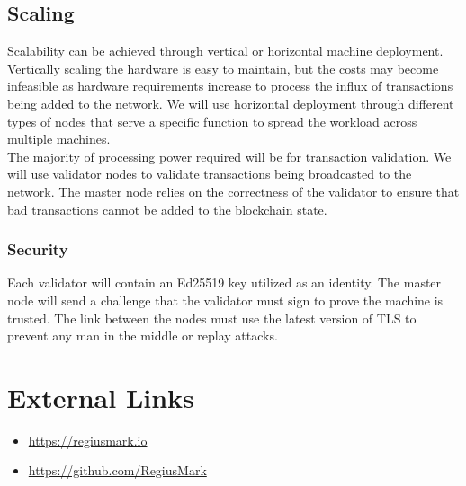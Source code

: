 \documentclass[12pt,a4paper]{article}
\begin{document}
  \subsection{Scaling}
  Scalability can be achieved through vertical or horizontal machine deployment.
  Vertically scaling the hardware is easy to maintain, but the costs may become
  infeasible as hardware requirements increase to process the influx of
  transactions being added to the network. We will use horizontal deployment
  through different types of nodes that serve a specific function to spread the
  workload across multiple machines.\\

  The majority of processing power required will be for transaction validation.
  We will use validator nodes to validate transactions being broadcasted to the
  network. The master node relies on the correctness of the validator to ensure
  that bad transactions cannot be added to the blockchain state.\\

  \subsubsection{Security}
  Each validator will contain an Ed25519 key utilized as an identity. The master
  node will send a challenge that the validator must sign to prove the machine
  is trusted. The link between the nodes must use the latest version of TLS to
  prevent any man in the middle or replay attacks.

  \newpage
  \section*{External Links}
  \begin{itemize}
    \item{\url{https://regiusmark.io}}
    \item{\url{https://github.com/RegiusMark}}
  \end{itemize}
  \printbibliography{}
\end{document}

